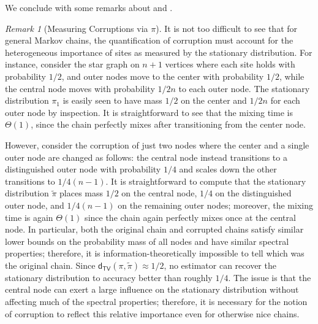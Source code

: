 \documentclass[11pt]{article}
\theoremstyle{remark}
\newtheorem{rmk}{Remark}[section]
\begin{document}
We conclude with some remarks about  and .
\begin{rmk}[Measuring Corruptions via $\pi$]
\label{rmk:pi_neccessary}
    It is not too difficult to see that for general Markov chains, the quantification of corruption must account for the heterogeneous importance of sites as measured by the stationary distribution. For instance, consider the star graph on $n+1$ vertices where each site holds with probability $1/2$, and outer nodes move to the center with probability $1/2$, while the central node moves with probability $1/2n$ to each outer node. The stationary distribution $\pi_1$ is easily seen to have mass $1/2$ on the center and $1/2n$ for each outer node by inspection. It is straightforward to see that the mixing time is $\Theta(1)$, since the chain perfectly mixes after transitioning from the center node.

    However, consider the corruption of just two nodes where the center and a single outer node are changed as follows: the central node instead transitions to a distinguished outer node with probability $1/4$ and scales down the other transitions to $1/4(n-1)$. It is straightforward to compute that the stationary distribution $\widetilde{\pi}$ places mass $1/2$ on the central node, $1/4$ on the distinguished outer node, and $1/4(n-1)$ on the remaining outer nodes; moreover, the mixing time is again $\Theta(1)$ since the chain again perfectly mixes once at the central node. In particular, both the original chain and corrupted chains satisfy similar lower bounds on the probability mass of all nodes and have similar spectral properties; therefore, it is information-theoretically impossible to tell which was the original chain. Since $\mathsf{d}_{\mathsf{TV}}(\pi,\widetilde{\pi})\approx 1/2$, no estimator can recover the stationary distribution to accuracy better than roughly $1/4$. The issue is that the central node can exert a large influence on the stationary distribution without affecting much of the spectral properties; therefore, it is necessary for the notion of corruption to reflect this relative importance even for otherwise nice chains.
\end{rmk}
\end{document}

